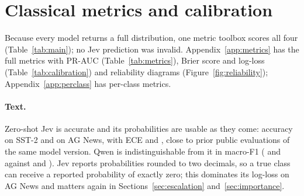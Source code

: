 \section{Classical metrics and calibration}
\label{sec:metrics}

Because every model returns a full distribution, one metric toolbox scores all four
(Table~\ref{tab:main}); no Jev prediction was invalid. Appendix~\ref{app:metrics} has the full
metrics with PR-AUC (Table~\ref{tab:metrics}), Brier score and log-loss
(Table~\ref{tab:calibration}) and reliability diagrams (Figure~\ref{fig:reliability});
Appendix~\ref{app:perclass} has per-class metrics.

\begin{table}[t]
  \caption{Zero-shot (Jev, Qwen3.6-27B) and supervised (XGBoost, BERT) models on identical
    evaluation examples. Accuracy carries a 95\% bootstrap interval (text) or the standard
    deviation over \NRepeats{} split repeats (tabular). ROC-AUC is for the positive class
    (binary) or one-vs-rest macro (AG News). Label budgets differ (Table~\ref{tab:labels}).}
  \label{tab:main}
  \centering\small
  
\end{table}

\paragraph{Text.}
Zero-shot Jev is accurate and its probabilities are usable as they come: accuracy
\AccuracyJevSst{} on SST-2 and \AccuracyJevAgnews{} on AG News, with ECE \EceJevSst{} and
\EceJevAgnews, close to prior public evaluations of the same model version. Qwen is
indistinguishable from it in macro-F1 (\MacroFOneQwenSst{} and \MacroFOneQwenAgnews{} against
\MacroFOneJevSst{} and \MacroFOneJevAgnews). Jev reports probabilities rounded to two decimals,
so a true class can receive a reported probability of exactly zero; this dominates its log-loss
on AG News and matters again in Sections~\ref{sec:escalation} and~\ref{sec:importance}.

\begin{table}[t]
  \caption{Error counts on the two tabular datasets, summed over the test parts of the
    \NRepeats{} split repeats. Positive is \emph{bad} (German Credit) or \emph{malignant} (Breast
    Cancer Wisconsin); cost is $5\,\text{FN} + \text{FP}$. Left: the default decision, positive
    when $P(\text{positive}) \ge 0.5$. Right: the threshold selected on validation labels to
    minimize this cost (Section~\ref{sec:thresholding}). The last row of each block calls every
    case positive.}
  \label{tab:confusion}
  \centering\small
  \setlength{\tabcolsep}{4pt}
  \fittable{}
\end{table}

